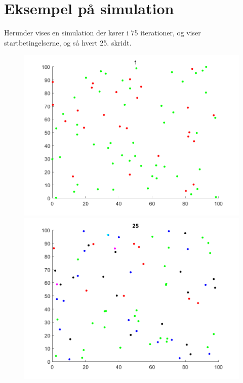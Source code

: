\documentclass[a4paper,10pt]{article} 	%
\numberwithin{equation}{section}
\begin{document}
	\newpage
	\section{Eksempel på simulation}
	Herunder vises en simulation der kører i 75 iterationer, og viser startbetingelserne, og så hvert 25. skridt.
	\begin{figure}[H]
		\centering
		\begin{minipage}{0.45\textwidth}
			\centering
			\includegraphics[width=\textwidth]{img/plot1.png}
		\end{minipage}
		\begin{minipage}{0.45\textwidth}
			\centering
			\includegraphics[width=\textwidth]{img/plot2.png}
		\end{minipage}

\end{figure}
\end{document}
